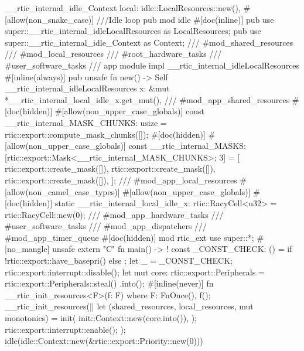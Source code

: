 {{{            __rtic_internal_idle_Context {
                local: idle::LocalResources::new(),
            }
        }
    }
    #[allow(non_snake_case)]
    ///Idle loop
    pub mod idle {
        #[doc(inline)]
        pub use super::__rtic_internal_idleLocalResources as LocalResources;
        pub use super::__rtic_internal_idle_Context as Context;
    }
    /// #mod_shared_resources
    /// #mod_local_resources
    /// #root_hardware_tasks
    /// #user_software_tasks
    /// app module
    impl __rtic_internal_idleLocalResources {
        #[inline(always)]
        pub unsafe fn new() -> Self {
            __rtic_internal_idleLocalResources {
                x: &mut *__rtic_internal_local_idle_x.get_mut(),
            }
        }
    }
    /// #mod_app_shared_resources
    #[doc(hidden)]
    #[allow(non_upper_case_globals)]
    const __rtic_internal_MASK_CHUNKS: usize = rtic::export::compute_mask_chunks([]);
    #[doc(hidden)]
    #[allow(non_upper_case_globals)]
    const __rtic_internal_MASKS: [rtic::export::Mask<__rtic_internal_MASK_CHUNKS>; 3] = [
        rtic::export::create_mask([]),
        rtic::export::create_mask([]),
        rtic::export::create_mask([]),
    ];
    /// #mod_app_local_resources
    #[allow(non_camel_case_types)]
    #[allow(non_upper_case_globals)]
    #[doc(hidden)]
    static __rtic_internal_local_idle_x: rtic::RacyCell<u32> = rtic::RacyCell::new(0);
    /// #mod_app_hardware_tasks
    /// #user_software_tasks
    /// #mod_app_dispatchers
    /// #mod_app_timer_queue
    #[doc(hidden)]
    mod rtic_ext {
        use super::*;
        #[no_mangle]
        unsafe extern "C" fn main() -> ! {
            const _CONST_CHECK: () = { if !rtic::export::have_basepri() {} else {} };
            let _ = _CONST_CHECK;
            rtic::export::interrupt::disable();
            let mut core: rtic::export::Peripherals = rtic::export::Peripherals::steal()
                .into();
            #[inline(never)]
            fn __rtic_init_resources<F>(f: F)
            where
                F: FnOnce(),
            {
                f();
            }
            __rtic_init_resources(|| {
                let (shared_resources, local_resources, mut monotonics) = init(
                    init::Context::new(core.into()),
                );
                rtic::export::interrupt::enable();
            });
            idle(idle::Context::new(&rtic::export::Priority::new(0)))
        }
    }
}
